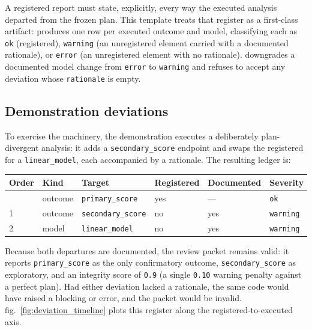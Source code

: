 \documentclass[
]{article}
\newcounter{none} %
\begin{document}
A registered report must state, explicitly, every way the executed
analysis departed from the frozen plan. This template treats that
register as a first-class artifact: 
produces one row per executed outcome and model, classifying each as
\texttt{ok} (registered), \texttt{warning} (an unregistered element
carried with a documented rationale), or \texttt{error} (an unregistered
element with no rationale). 
downgrades a documented model change from \texttt{error} to
\texttt{warning} and refuses to accept any deviation whose
\texttt{rationale} is empty.

\subsection{Demonstration deviations}\label{demonstration-deviations}

To exercise the machinery, the demonstration executes a deliberately
plan-divergent analysis: it adds a \texttt{secondary\_score} endpoint
and swaps the registered  for a
\texttt{linear\_model}, each accompanied by a rationale. The resulting
ledger is:

{\def\LTcaptype{none} %
\begin{longtable}[]{@{}llllll@{}}
\toprule\noalign{}
Order & Kind & Target & Registered & Documented & Severity \\
\midrule\noalign{}
\endhead
\bottomrule\noalign{}
\endlastfoot
0 & outcome & \texttt{primary\_score} & yes & --- & \texttt{ok} \\
1 & outcome & \texttt{secondary\_score} & no & yes & \texttt{warning} \\
2 & model & \texttt{linear\_model} & no & yes & \texttt{warning} \\
\end{longtable}
}

Because both departures are documented, the review packet remains valid:
it reports \texttt{primary\_score} as the only confirmatory outcome,
\texttt{secondary\_score} as exploratory, and an integrity score of
\texttt{0.9} (a single \texttt{0.10} warning penalty against a perfect
plan). Had either deviation lacked a rationale, the same code would have
raised a blocking  or
 error, and the packet would be invalid.
fig.~\ref{fig:deviation_timeline} plots this register along the
registered-to-executed axis.
\end{document}
